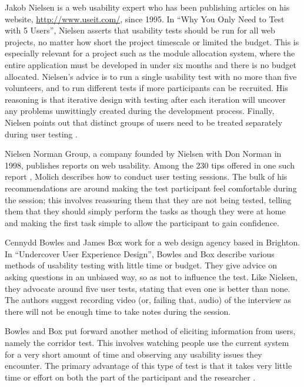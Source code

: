 \documentclass[draft]{scrartcl}
\begin{document}
Jakob Nielsen is a web usability expert who has been publishing articles on
his website, \url{http://www.useit.com/}, since 1995. In ``Why You Only Need to
Test with 5 Users'', Nielsen asserts that usability tests should be run for all
web projects, no matter how short the project timescale or limited the budget.
This is especially relevant for a project such as the module allocation
system, where the entire application must be developed in under six months and
there is no budget allocated. Nielsen's advice is to run a single usability
test with no more than five volunteers, and to run different tests if more
participants can be recruited. His reasoning is that iterative design with
testing after each iteration will uncover any problems unwittingly created
during the development process. Finally, Nielsen points out that distinct
groups of users need to be treated separately during user testing
\cite{nielsen2000fiveusers}.

Nielsen Norman Group, a company founded by Nielsen with Don Norman in 1998,
publishes reports on web usability. Among the 230 tips offered in one such
report \cite{nng2001tipsusability}, Molich describes how to conduct user
testing sessions. The bulk of his recommendations are around making the test
participant feel comfortable during the session; this involves reassuring them
that they are not being tested, telling them that they should simply perform
the tasks as though they were at home and making the first task simple to
allow the participant to gain confidence.

Cennydd Bowles and James Box work for a web design agency based in Brighton.
In ``Undercover User Experience Design'', Bowles and Box describe various
methods of usability testing with little time or budget. They give advice on
asking questions in an unbiased way, so as not to influence the test. Like
Nielsen, they advocate around five user tests, stating that even one is better
than none. The authors suggest recording video (or, failing that, audio) of
the interview as there will not be enough time to take notes during the
session.

Bowles and Box put forward another method of eliciting information from users,
namely the corridor test. This involves watching people use the current system
for a very short amount of time and observing any usability issues they
encounter. The primary advantage of this type of test is that it takes very
little time or effort on both the part of the participant and the researcher
\cite{bowles2011undercover}.
\end{document}

